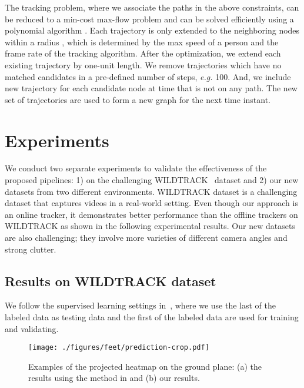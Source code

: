 \documentclass{article}
\begin{document}
The tracking problem, where we associate the paths in the above constraints, can be reduced to a
min-cost max-flow problem
and
can be solved efficiently using a polynomial algorithm \cite{papadimitrou1982combinatorial}.
Each trajectory is only extended to the
neighboring nodes within a radius , which is determined by the max speed
of a person and the frame rate of the tracking algorithm.
After the optimization, we extend each existing trajectory by one-unit length. We remove
trajectories which have no matched candidates in a pre-defined number of steps, \textit{e.g.} 100. 
 And, we include new trajectory for each
candidate node at time  that is not on any path. The new set of trajectories are used to form
a new graph for the next time instant.
\section{Experiments}
We conduct two separate experiments to validate the effectiveness of the proposed pipelines: 1) on the challenging WILDTRACK~\cite{chavdarova2018wildtrack}  dataset and 2) our new datasets from two different environments.
WILDTRACK dataset is a challenging dataset that captures videos in a real-world setting. Even though our approach is an online tracker, it demonstrates better performance than the
 offline trackers on WILDTRACK as shown in the following experimental results. Our new datasets are also challenging; they involve more varieties of different camera angles and strong clutter.
\subsection{Results on WILDTRACK dataset}
We follow the supervised learning settings in~\cite{chavdarova2018wildtrack}, where we use the last  of the labeled data as testing data and the first  of the labeled data are used for training and validating.

\begin{figure}[!htbp]
	\begin{center}
		\texttt{[image: ./figures/feet/prediction-crop.pdf]}
	\end{center}
	\caption{Examples of the projected heatmap on the ground plane: (a) the results using
	the method in \cite{zhou2019objects} and (b) our results. }
	\label{fig:feet:pred}
\end{figure}
\end{document}
